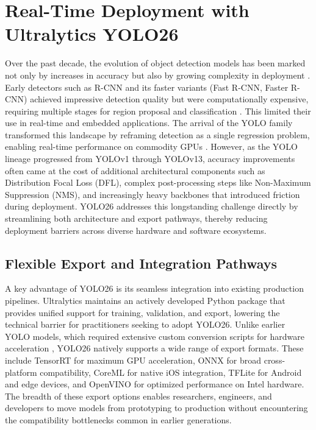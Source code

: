 \documentclass{article}
\begin{document}
\section{Real-Time Deployment with Ultralytics YOLO26}

Over the past decade, the evolution of object detection models has been marked not only by increases in accuracy but also by growing complexity in deployment \cite{trigka2025comprehensive, hosain2024synchronizing, pravallika2024deep}. Early detectors such as R-CNN and its faster variants (Fast R-CNN, Faster R-CNN) achieved impressive detection quality but were computationally expensive, requiring multiple stages for region proposal and classification \cite{tian2025faster, fu2024lithology, mohammed2025architecture}. This limited their use in real-time and embedded applications. The arrival of the YOLO family transformed this landscape by reframing detection as a single regression problem, enabling real-time performance on commodity GPUs \cite{johnson2025yolo}. However, as the YOLO lineage progressed from YOLOv1 through YOLOv13, accuracy improvements often came at the cost of additional architectural components such as Distribution Focal Loss (DFL), complex post-processing steps like Non-Maximum Suppression (NMS), and increasingly heavy backbones that introduced friction during deployment. YOLO26 addresses this longstanding challenge directly by streamlining both architecture and export pathways, thereby reducing deployment barriers across diverse hardware and software ecosystems.

\subsection{Flexible Export and Integration Pathways}

A key advantage of YOLO26 is its seamless integration into existing production pipelines. Ultralytics maintains an actively developed Python package that provides unified support for training, validation, and export, lowering the technical barrier for practitioners seeking to adopt YOLO26. Unlike earlier YOLO models, which required extensive custom conversion scripts for hardware acceleration \cite{pestana2021full, nguyen2019high, ding2019req}, YOLO26 natively supports a wide range of export formats. These include TensorRT for maximum GPU acceleration, ONNX for broad cross-platform compatibility, CoreML for native iOS integration, TFLite for Android and edge devices, and OpenVINO for optimized performance on Intel hardware. The breadth of these export options enables researchers, engineers, and developers to move models from prototyping to production without encountering the compatibility bottlenecks common in earlier generations.
\end{document}
